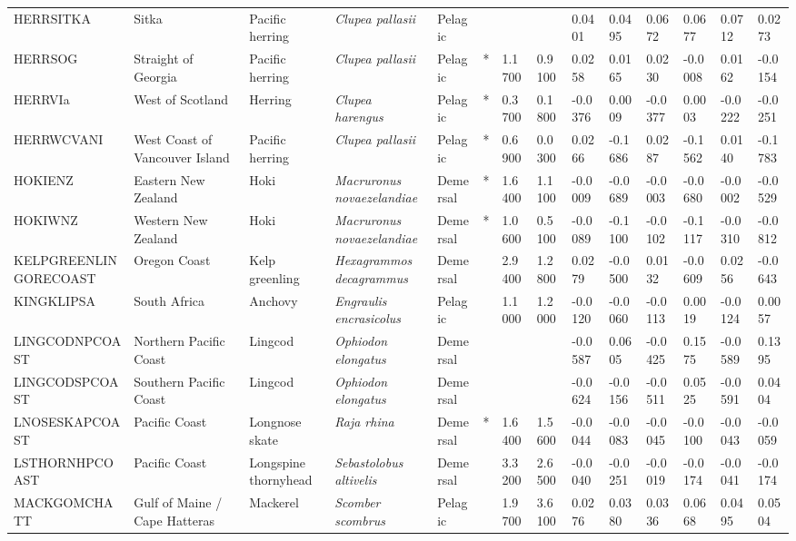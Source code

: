 \begin{longtable}{p{2.6cm}p{1.9cm}p{1.7cm}p{1.6cm}p{1cm}p{0.3cm}p{1cm}p{1cm}p{1cm}p{1.1cm}p{1cm}p{1.1cm}p{1cm}p{1.1cm}}
  HERRSITKA & Sitka & Pacific herring & \textit{Clupea pallasii} & Pelagic &  &  &  & 0.0401 & 0.0495 & 0.0672 & 0.0677 & 0.0712 & 0.0273 \\ 
  HERRSOG & Straight of Georgia & Pacific herring & \textit{Clupea pallasii} & Pelagic & * & 1.1700 & 0.9100 & 0.0258 & 0.0165 & 0.0230 & -0.0008 & 0.0162 & -0.0154 \\ 
  HERRVIa & West of Scotland & Herring & \textit{Clupea harengus} & Pelagic & * & 0.3700 & 0.1800 & -0.0376 & 0.0009 & -0.0377 & 0.0003 & -0.0222 & -0.0251 \\ 
  HERRWCVANI & West Coast of Vancouver Island & Pacific herring & \textit{Clupea pallasii} & Pelagic & * & 0.6900 & 0.0300 & 0.0266 & -0.1686 & 0.0287 & -0.1562 & 0.0140 & -0.1783 \\ 
  HOKIENZ & Eastern New Zealand & Hoki & \textit{Macruronus novaezelandiae} & Demersal & * & 1.6400 & 1.1100 & -0.0009 & -0.0689 & -0.0003 & -0.0680 & -0.0002 & -0.0529 \\ 
  HOKIWNZ & Western New Zealand & Hoki & \textit{Macruronus novaezelandiae} & Demersal & * & 1.0600 & 0.5100 & -0.0089 & -0.1100 & -0.0102 & -0.1117 & -0.0310 & -0.0812 \\ 
  KELPGREENLINGORECOAST & Oregon Coast & Kelp greenling & \textit{Hexagrammos decagrammus} & Demersal &   & 2.9400 & 1.2800 & 0.0279 & -0.0500 & 0.0132 & -0.0609 & 0.0256 & -0.0643 \\ 
  KINGKLIPSA & South Africa & Anchovy & \textit{Engraulis encrasicolus} & Pelagic &   & 1.1000 & 1.2000 & -0.0120 & -0.0060 & -0.0113 & 0.0019 & -0.0124 & 0.0057 \\ 
  LINGCODNPCOAST & Northern Pacific Coast & Lingcod & \textit{Ophiodon elongatus} & Demersal &  &  &  & -0.0587 & 0.0605 & -0.0425 & 0.1575 & -0.0589 & 0.1395 \\ 
  LINGCODSPCOAST & Southern Pacific Coast & Lingcod & \textit{Ophiodon elongatus} & Demersal &  &  &  & -0.0624 & -0.0156 & -0.0511 & 0.0525 & -0.0591 & 0.0404 \\ 
  LNOSESKAPCOAST & Pacific Coast & Longnose skate & \textit{Raja rhina} & Demersal & * & 1.6400 & 1.5600 & -0.0044 & -0.0083 & -0.0045 & -0.0100 & -0.0043 & -0.0059 \\ 
  LSTHORNHPCOAST & Pacific Coast & Longspine thornyhead & \textit{Sebastolobus altivelis} & Demersal &   & 3.3200 & 2.6500 & -0.0040 & -0.0251 & -0.0019 & -0.0174 & -0.0041 & -0.0174 \\ 
  MACKGOMCHATT & Gulf of Maine / Cape Hatteras & Mackerel & \textit{Scomber scombrus} & Pelagic &   & 1.9700 & 3.6100 & 0.0276 & 0.0380 & 0.0336 & 0.0668 & 0.0495 & 0.0504 \\ 

\end{longtable}
